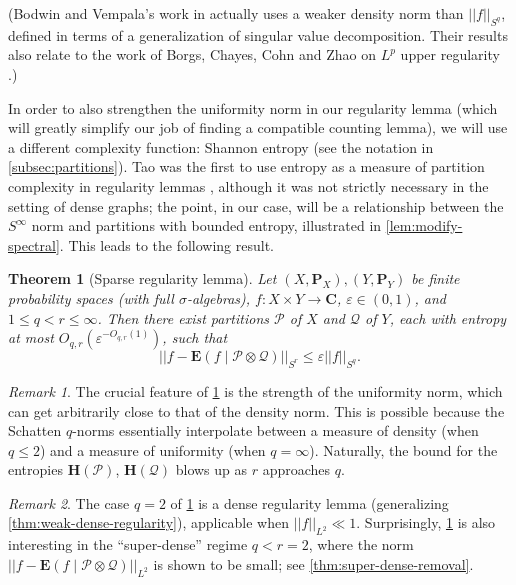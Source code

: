 \documentclass[reqno,11pt]{amsart}
\newtheorem{theorem}{Theorem}[section]
\theoremstyle{definition}
\theoremstyle{remark}
\newtheorem*{remark}{Remark}
\numberwithin{equation}{section}
\newcommand{\C}{\mathbf{C}}
\renewcommand{\P}{\mathbf{P}}
\renewcommand{\H}{\mathbf{H}}
\newcommand{\E}{\mathbf{E}}
\newcommand{\mP}{\mathcal{P}}
\newcommand{\mQ}{\mathcal{Q}}
\newcommand{\eps}{\varepsilon}
\begin{document}
(Bodwin and Vempala's work in \cite{bodwin2022unified} actually uses a weaker density norm than $||f||_{S^q}$, defined in terms of a generalization of singular value decomposition. Their results also relate to the work of Borgs, Chayes, Cohn and Zhao on $L^p$ upper regularity \cite{borgs2019p,borgs2018p}.)

In order to also strengthen the uniformity norm in our regularity lemma (which will greatly simplify our job of finding a compatible counting lemma), we will use a different complexity function: Shannon entropy (see the notation in \cref{subsec:partitions}). Tao was the first to use entropy as a measure of partition complexity in regularity lemmas \cite{tao2005szemer}, although it was not strictly necessary in the setting of dense graphs; the point, in our case, will be a relationship between the $S^\infty$ norm and partitions with bounded entropy, illustrated in \cref{lem:modify-spectral}. This leads to the following result.
\fi

\begin{theorem}[Sparse regularity lemma]\label{thm:regularity-intro} 
Let $(X, \P_X), (Y, \P_Y)$ be finite probability spaces (with full $\sigma$-algebras), $f : X \times Y \to \C$, $\eps \in (0, 1)$, and $1 \le q < r \le \infty$. Then there exist partitions $\mP$ of $X$ and $\mQ$ of $Y$, each with entropy at most $O_{q,r}(\eps^{-O_{q,r}(1)})$, such that
\[
    \left\vert \left\vert f - \E(f \mid \mP \otimes \mQ)
    \right\vert\right\vert_{S^r} \le \eps ||f||_{S^q}.
\]
\end{theorem}

\begin{remark} The crucial feature of \cref{thm:regularity-intro} is the strength of the uniformity norm, which can get arbitrarily close to that of the density norm. This is possible because the Schatten $q$-norms essentially interpolate between a measure of density (when $q \le 2$) and a measure of uniformity (when $q = \infty$). Naturally, the bound for the entropies $\H(\mP)$, $\H(\mQ)$ blows up as $r$ approaches $q$.
\end{remark}

\begin{remark}
The case $q = 2$ of \cref{thm:regularity-intro} is a dense regularity lemma (generalizing \cref{thm:weak-dense-regularity}), applicable when $||f||_{L^2} \ll 1$. Surprisingly, \cref{thm:regularity-intro} is also interesting in the ``super-dense'' regime $q < r = 2$, where the norm $||f - \E(f \mid \mP \otimes \mQ)||_{L^2}$ is shown to be small; see \cref{thm:super-dense-removal}.
\end{remark}
\end{document}
